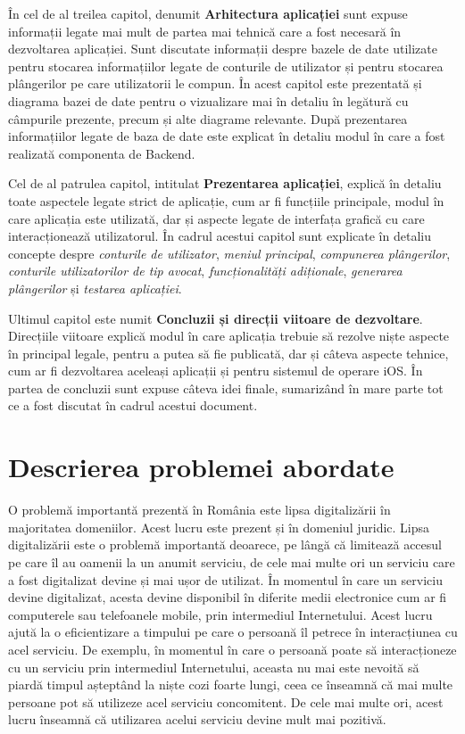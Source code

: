 \documentclass[12pt,a4paper]{report}
\theoremstyle{definition}
\theoremstyle{remark}
\begin{document}
În cel de al treilea capitol, denumit \textbf{Arhitectura aplicației} sunt expuse informații legate mai mult de partea mai tehnică care a fost necesară în dezvoltarea aplicației. Sunt discutate informații despre bazele de date utilizate pentru stocarea informațiilor legate de conturile de utilizator și pentru stocarea plângerilor pe care utilizatorii le compun. În acest capitol este prezentată și diagrama bazei de date pentru o vizualizare mai în detaliu în legătură cu câmpurile prezente, precum și alte diagrame relevante. După prezentarea informațiilor legate de baza de date este explicat în detaliu modul în care a fost realizată componenta de Backend.

Cel de al patrulea capitol, intitulat \textbf{Prezentarea aplicației}, explică în detaliu toate aspectele legate strict de aplicație, cum ar fi funcțiile principale, modul în care aplicația este utilizată, dar și aspecte legate de interfața grafică cu care interacționează utilizatorul. În cadrul acestui capitol sunt explicate în detaliu concepte despre \emph{conturile de utilizator}, \emph{meniul principal}, \emph{compunerea plângerilor}, \emph{conturile utilizatorilor de tip avocat}, \emph{funcționalități adiționale}, \emph{generarea plângerilor} și \emph{testarea aplicației}.

Ultimul capitol este numit \textbf{Concluzii și direcții viitoare de dezvoltare}. Direcțiile viitoare explică modul în care aplicația trebuie să rezolve niște aspecte în principal legale, pentru a putea să fie publicată, dar și câteva aspecte tehnice, cum ar fi dezvoltarea aceleași aplicații și pentru sistemul de operare iOS. În partea de concluzii sunt expuse câteva idei finale, sumarizând în mare parte tot ce a fost discutat în cadrul acestui document.
\newpage
\section{Descrierea problemei abordate}
\vspace{20pt}
O problemă importantă prezentă în România este lipsa digitalizării în majoritatea domeniilor. Acest lucru este prezent și în domeniul juridic. Lipsa digitalizării este o problemă importantă deoarece, pe lângă că limitează accesul pe care îl au oamenii la un anumit serviciu, de cele mai multe ori un serviciu care a fost digitalizat devine și mai ușor de utilizat. În momentul în care un serviciu devine digitalizat, acesta devine disponibil în diferite medii electronice cum ar fi computerele sau telefoanele mobile, prin intermediul Internetului. Acest lucru ajută la o eficientizare a timpului pe care o persoană îl petrece în interacțiunea cu acel serviciu. De exemplu, în momentul în care o persoană poate să interacționeze cu un serviciu prin intermediul Internetului, aceasta nu mai este nevoită să piardă timpul așteptând la niște cozi foarte lungi, ceea ce înseamnă că mai multe persoane pot să utilizeze acel serviciu concomitent. De cele mai multe ori, acest lucru înseamnă că utilizarea acelui serviciu devine mult mai pozitivă. 
\end{document}
